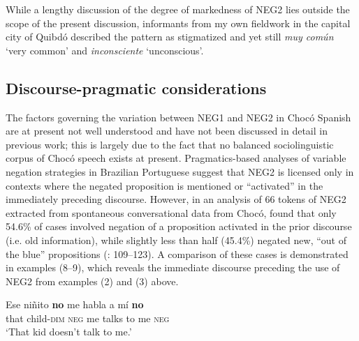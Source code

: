 \documentclass[output=paper,colorlinks,citecolor=brown]{langscibook}
\begin{document}
While a lengthy discussion of the degree of markedness of NEG2 lies outside the scope of the present discussion, informants from my own fieldwork in the capital city of Quibdó described the pattern as stigmatized and yet still \emph{muy común} ‘very common’ and \emph{inconsciente} ‘unconscious’. 

\subsection{Discourse-pragmatic considerations}

The factors governing the variation between NEG1 and NEG2 in Chocó Spanish are at present not well understood and have not been discussed in detail in previous work; this is largely due to the fact that no balanced sociolinguistic corpus of Chocó speech exists at present. Pragmatics-based analyses of variable negation strategies in Brazilian Portuguese \citep[e.g.][]{Schwenter_2005} suggest that NEG2 is licensed only in contexts where the negated proposition is mentioned or “activated” in the immediately preceding discourse. However, in an analysis of 66 tokens of NEG2 extracted from spontaneous conversational data from Chocó, \citeauthor{RuizGarcia_2001} found that only 54.6\% of cases involved negation of a proposition activated in the prior discourse (i.e. old information), while slightly less than half (45.4\%) negated new, “out of the blue” propositions (\citeyear{RuizGarcia_2001}: 109--123). A comparison of these cases is demonstrated in examples (8–9), which reveals the immediate discourse preceding the use of NEG2 from examples (2) and (3) above.

\ea \citep{RuizGarcia_2001}
\begin{xlist}[Speaker A:]
{\gll Ese niñito \textbf{no} me habla a mí \textbf{no}\\
     that child-\textsc{dim} \textsc{neg} me talks to me \textsc{neg}\\
\glt ‘That kid doesn’t talk to me.’}
\end{xlist}
\z
\end{document}
